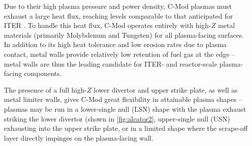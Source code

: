 \begin{figure}[t]
 \pushtooutside
\end{figure}

Due to their high plasma pressure and power density, C-Mod plasmas must exhaust a large heat flux, reaching levels comparable to that anticipated for ITER \cite{Loarte2007,Terry2007,LaBombard2011}.  To handle this heat flux, C-Mod operates entirely with high-$Z$ metal materials (primarily Molybdenum and Tungsten) for all plasma-facing surfaces.  In addition to its high heat tolerance and low erosion rates due to plasma contact, metal walls provide relatively low retention of fuel gas at the edge -- metal walls are thus the leading candidate for ITER- and reactor-scale plasma-facing components.

The presence of a full high-$Z$ lower divertor and upper strike plate, as well as metal limiter walls, gives C-Mod great flexibility in attainable plasma shapes -- plasmas may be run in a lower-single null (LSN) shape with the plasma exhaust striking the lower divertor (shown in \cref{fig:alcator2}, upper-single null (USN) exhausting into the upper strike plate, or in a limited shape where the scrape-off layer directly impinges on the plasma-facing wall.\nicesectionending

